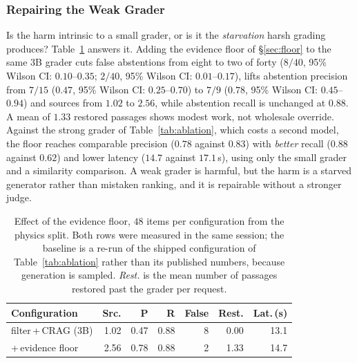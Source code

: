\documentclass[conference]{IEEEtran}
\begin{document}
\subsubsection{Repairing the Weak Grader}
\label{sec:flooreval}
Is the harm intrinsic to a small grader, or is it the \emph{starvation} harsh
grading produces? Table~\ref{tab:floor} answers it. Adding the evidence floor of
§\ref{sec:floor} to the same $3$B grader cuts false abstentions from
eight to two of forty ($8/40$, 95\% Wilson CI: $0.10$--$0.35$;
$2/40$, 95\% Wilson CI: $0.01$--$0.17$), lifts abstention precision
from $7/15$ ($0.47$, 95\% Wilson CI: $0.25$--$0.70$) to $7/9$
($0.78$, 95\% Wilson CI: $0.45$--$0.94$) and sources from $1.02$ to $2.56$,
while abstention recall is unchanged at $0.88$. A mean of $1.33$ restored
passages shows modest work, not wholesale override. Against the strong grader
of Table~\ref{tab:ablation}, which costs a second model, the floor reaches
comparable precision ($0.78$ against $0.83$) with \emph{better} recall ($0.88$
against $0.62$) and lower latency ($14.7$ against $17.1$\,s), using only the
small grader and a similarity comparison. A weak grader is harmful, but the harm
is a starved generator rather than mistaken ranking, and it is repairable
without a stronger judge.

\begin{table}[htbp]
\caption{Effect of the evidence floor, $48$ items per configuration from the
physics split. Both rows were measured in the same session; the baseline is a
re-run of the shipped configuration of Table~\ref{tab:ablation} rather than its
published numbers, because generation is sampled. \emph{Rest.} is the mean
number of passages restored past the grader per request.}
\label{tab:floor}
\centering
\footnotesize
\setlength{\tabcolsep}{4pt}
\begin{tabular}{@{}lrrrrrr@{}}
\toprule
\textbf{Configuration} & \textbf{Src.} & \textbf{P} & \textbf{R} & \textbf{False} & \textbf{Rest.} & \textbf{Lat.\,(s)} \\
\midrule
filter\,+\,CRAG ($3$B) & 1.02 & 0.47 & 0.88 & 8 & 0.00 & 13.1 \\
\quad +\,evidence floor & 2.56 & 0.78 & 0.88 & 2 & 1.33 & 14.7 \\
\bottomrule
\end{tabular}
\end{table}
\end{document}
